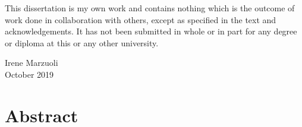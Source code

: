 \begin{onehalfspacing}
\vspace{.2cm}

\noindent This dissertation is my own work and contains nothing which is the outcome of work done in collaboration with others, except as specified in the text and acknowledgements.
%
It has not been submitted in whole or in part for any degree or diploma at this or any other university.

\vspace{1.5cm}

\begin{raggedleft}
Irene Marzuoli \\
October 2019

\end{raggedleft}
\end{onehalfspacing}


%
%

\clearpage
\thispagestyle{empty}
\chapter*{Abstract}


